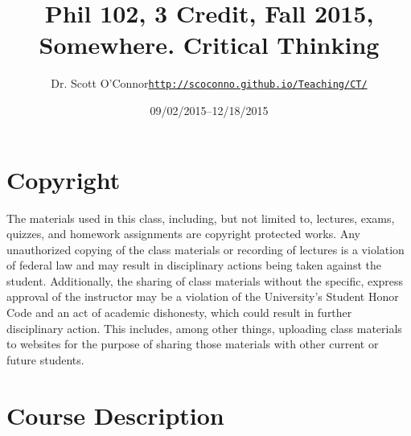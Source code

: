 \documentclass[11pt,article,oneside]{memoir}
\def\myauthor{Author}
\def\mytitle{Title}
\def\mycopyright{\myauthor}
\def\myweb{\href{http://scoconno.github.io/Teaching/CT/}{http://scoconno.github.io/Teaching/CT/}}
\def\myauthor{Dr. Scott O'Connor}
\def\mytitle{{\normalsize Phil 102, 3 Credit, Fall 2015, Somewhere. \newline} \HUGE Critical Thinking}
\begin{document}
\setsansfont[Mapping=tex-text]{Georgia} 
\setmonofont[Mapping=tex-text,Scale=0.8]{Georgia} 

\def\ind{\hangindent=1 true cm\hangafter=1 \noindent}
\def\labelitemi{$\cdot$}

\pagestyle{kjh}

\title{\LARGE \mytitle}     
\author{\Large\myauthor \newline \footnotesize\texttt{\noindent\myweb}}
\date{09/02/2015--12/18/2015}

\published{\,}

\maketitle




%
%

\section{Copyright}
The materials used in this class, including, but not limited to, lectures, exams, quizzes, and homework assignments are copyright protected works.  Any unauthorized copying of the class materials or recording of lectures is a violation of federal law and may result in disciplinary actions being taken against the student.  Additionally, the sharing of class materials without the specific, express approval of the instructor may be a violation of the University's Student Honor Code and an act of academic dishonesty, which could result in further disciplinary action.  This includes, among other things, uploading class materials to websites for the purpose of sharing those materials with other current or future students. 

\section{Course Description}
\end{document}
